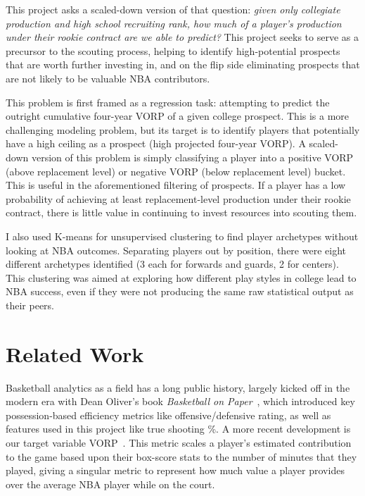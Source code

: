 \documentclass[conference]{IEEEtran}
\begin{document}
This project asks a scaled-down version of that question: \emph{given only collegiate production and high school recruiting rank, how much of a player's production under their rookie contract are we able to predict?} This project seeks to serve as a precursor to the scouting process, helping to identify high-potential prospects that are worth further investing in, and on the flip side eliminating prospects that are not likely to be valuable NBA contributors.

This problem is first framed as a regression task: attempting to predict the outright cumulative four-year VORP of a given college prospect. This is a more challenging modeling problem, but its target is to identify players that potentially have a high ceiling as a prospect (high projected four-year VORP). A scaled-down version of this problem is simply classifying a player into a positive VORP (above replacement level) or negative VORP (below replacement level) bucket. This is useful in the aforementioned filtering of prospects. If a player has a low probability of achieving at least replacement-level production under their rookie contract, there is little value in continuing to invest resources into scouting them.

I also used K-means for unsupervised clustering to find player archetypes without looking at NBA outcomes. Separating players out by position, there were eight different archetypes identified (3 each for forwards and guards, 2 for centers). This clustering was aimed at exploring how different play styles in college lead to NBA success, even if they were not producing the same raw statistical output as their peers.

\section{Related Work}


Basketball analytics as a field has a long public history, largely kicked off in the modern era with Dean Oliver's book \emph{Basketball on Paper}~\cite{oliver2004basketball}, which introduced key possession-based efficiency metrics like offensive/defensive rating, as well as features used in this project like true shooting \%. A more recent development is our target variable VORP~\cite{myers2020bpm}. This metric scales a player's estimated contribution to the game based upon their box-score stats to the number of minutes that they played, giving a singular metric to represent how much value a player provides over the average NBA player while on the court.
\end{document}
